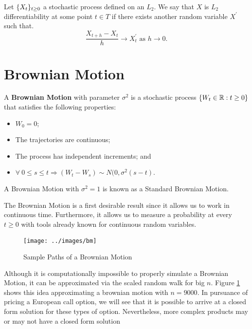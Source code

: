 \documentclass[../TGMAFFIRO]{subfiles}
\begin{document}
\begin{definition}[$L_2$ differentiability]
Let $\{X_t\}_{t\geq 0}$ a stochastic process defined on an $L_2$. We say that $X$ is $L_2$ differentiability at some point $t\in T$ if there exists another random variable $X^\prime$ such that.
\begin{equation}
	\frac{X_{t+h}- X_t}{h} \to X^\prime_t \text{ as } h\to 0.
\end{equation}
\end{definition}

\section{Brownian Motion}
\begin{definition}\label{def:brownian_motion}
	A \textbf{Brownian Motion} with parameter $\sigma^2$ is a stochastic process $\{W_t \in \mathbb{R}:t\geq 0\}$ that satisfies the following properties:
	\begin{itemize}
		\item $W_0 = 0$;
		\item The trajectories are continuous; 
		\item The process has independent increments; and
		\item $\forall \ 0 \leq s \leq t \Longrightarrow (W_t - W_s) \sim N(0, \sigma^2(s - t)$.
	\end{itemize}
\end{definition}

\begin{remark}
	A Brownian Motion with $\sigma^2 = 1$ is known as a Standard Brownian Motion.
\end{remark}

The Brownian Motion is a first desirable result since it allows us to work in continuous time. Furthermore, it allows us to measure a probability at every $t\geq 0$ with tools already known for continuous random variables. 

\begin{figure}[h]
	\centering
	\label{fig:Brownian_Motion}
	\texttt{[image: ../images/bm]}
	\caption{Sample Paths of a Brownian Motion}
\end{figure}

Although it is computationally impossible to properly simulate a Brownian Motion, it can be approximated via the scaled random walk for big $n$. Figure \ref{fig:Brownian_Motion} shows this idea approximating a brownian motion with $n=9000$. In pursuance of pricing a European call option, we will see that it is possible to arrive at a closed form solution for these types of option. Nevertheless, more complex products may or may not have a closed form solution\\
\end{document}
